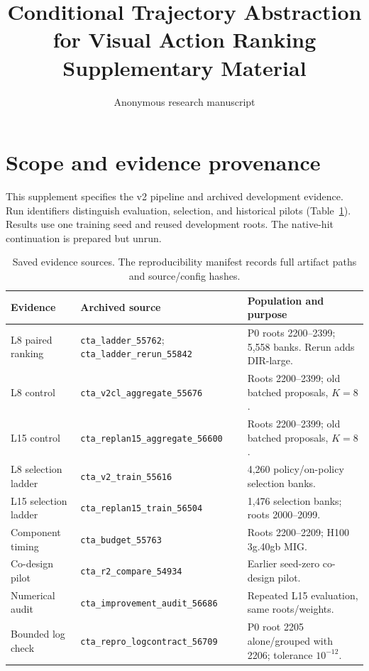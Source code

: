 \documentclass[10pt,twocolumn,letterpaper]{article}
\title{Conditional Trajectory Abstraction for Visual Action Ranking\\Supplementary Material}
\author{Anonymous research manuscript}
\begin{document}
\maketitle
\section{Scope and evidence provenance}
This supplement specifies the v2 pipeline and archived development evidence. Run identifiers distinguish evaluation, selection, and historical pilots (Table~\ref{tab:provenance}). Results use one training seed and reused development roots. The native-hit continuation is prepared but unrun.

\begin{table}[t]
\centering\small
\setlength{\tabcolsep}{4pt}
\begin{tabular}{p{.19\linewidth}p{.30\linewidth}p{.40\linewidth}}
\toprule
Evidence & Archived source & Population and purpose \\
\midrule
L8 paired ranking & \texttt{cta\_ladder\_55762}; \texttt{cta\_ladder\_rerun\_55842} & P0 roots 2200--2399; 5,558 banks. Rerun adds DIR-large. \\
L8 control & \texttt{cta\_v2cl\_aggregate\_55676} & Roots 2200--2399; old batched proposals, $K=8$. \\
L15 control & \texttt{cta\_replan15\_aggregate\_56600} & Roots 2200--2399; old batched proposals, $K=8$. \\
L8 selection ladder & \texttt{cta\_v2\_train\_55616} & 4,260 policy/on-policy selection banks. \\
L15 selection ladder & \texttt{cta\_replan15\_train\_56504} & 1,476 selection banks; roots 2000--2099. \\
Component timing & \texttt{cta\_budget\_55763} & Roots 2200--2209; H100 3g.40gb MIG. \\
Co-design pilot & \texttt{cta\_r2\_compare\_54934} & Earlier seed-zero co-design pilot. \\
Numerical audit & \texttt{cta\_improvement\_audit\_56686} & Repeated L15 evaluation, same roots/weights. \\
Bounded log check & \texttt{cta\_repro\_logcontract\_56709} & P0 root 2205 alone/grouped with 2206; tolerance $10^{-12}$. \\
\bottomrule
\end{tabular}
\caption{Saved evidence sources. The reproducibility manifest records full artifact paths and source/config hashes.}
\label{tab:provenance}
\end{table}
\end{document}
